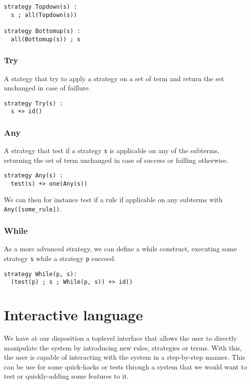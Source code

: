 \documentclass[12pt,a4paper]{article}
\begin{document}
\begin{verbatim}
strategy Topdown(s) :
  s ; all(Topdown(s))

strategy Bottomup(s) :
  all(Bottomup(s)) ; s
\end{verbatim}

\subsubsection*{Try}
A stategy that try to apply a strategy on a set of term and return the set unchanged
in case of faillure.

\begin{verbatim}
strategy Try(s) :
  s +> id() 
\end{verbatim}


\subsubsection*{Any}
A strategy that test if a strategy \verb|s| is applicable on any of the subterms,
returning the set of term unchanged in case of success or failling otherwise.

\begin{verbatim}
strategy Any(s) :
  test(s) +> one(Any(s))
\end{verbatim}

We can then for instance test if a rule if applicable on any subterms with
\verb|Any([some_rule])|.

\subsubsection*{While}
As a more advanced strategy, we can define a while construct, executing some strategy \verb|s| while a strategy \verb|p| succeed.

\begin{verbatim}
strategy While(p, s):
  (test(p) ; s ; While(p, s)) +> id()
\end{verbatim}


\section{Interactive language}

We have at our disposition a toplevel interface that allows the user
to directly manipulate the system by introducing new rules, strategies
or terms. With this, the user is capable of interacting with the
system in a step-by-step manner. This can be use for some quick-hacks
or tests through a system that we would want to test or quickly-adding
some features to it.
\end{document}
